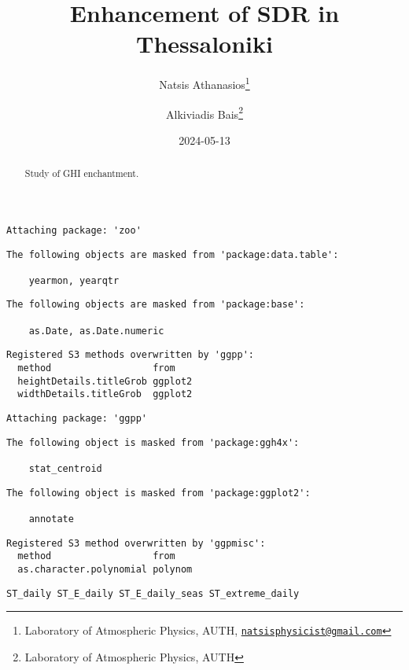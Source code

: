 \documentclass[
  10pt,
  a4paper,oneside]{article}
\title{Enhancement of SDR in Thessaloniki}
\author{Natsis Athanasios\footnote{Laboratory of Atmospheric Physics, AUTH, \href{mailto:natsisphysicist@gmail.com}{\nolinkurl{natsisphysicist@gmail.com}}} \and Alkiviadis Bais\footnote{Laboratory of Atmospheric Physics, AUTH}}
\date{2024-05-13}
\begin{document}
\maketitle
\begin{abstract}
Study of GHI enchantment.
\end{abstract}

{
\hypersetup{linkcolor=}
\setcounter{tocdepth}{4}
\tableofcontents
}
\begin{verbatim}
Attaching package: 'zoo'
\end{verbatim}

\begin{verbatim}
The following objects are masked from 'package:data.table':

    yearmon, yearqtr
\end{verbatim}

\begin{verbatim}
The following objects are masked from 'package:base':

    as.Date, as.Date.numeric
\end{verbatim}

\begin{verbatim}
Registered S3 methods overwritten by 'ggpp':
  method                  from   
  heightDetails.titleGrob ggplot2
  widthDetails.titleGrob  ggplot2
\end{verbatim}

\begin{verbatim}
Attaching package: 'ggpp'
\end{verbatim}

\begin{verbatim}
The following object is masked from 'package:ggh4x':

    stat_centroid
\end{verbatim}

\begin{verbatim}
The following object is masked from 'package:ggplot2':

    annotate
\end{verbatim}

\begin{verbatim}
Registered S3 method overwritten by 'ggpmisc':
  method                  from   
  as.character.polynomial polynom
\end{verbatim}

\begin{verbatim}
ST_daily ST_E_daily ST_E_daily_seas ST_extreme_daily
\end{verbatim}
\end{document}
